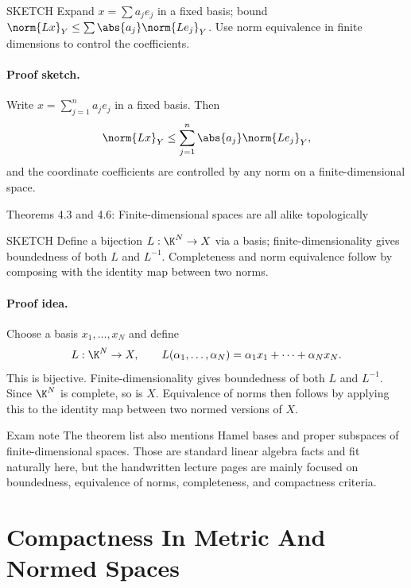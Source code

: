\documentclass[header={Lecture 2 Exam Study Notes}]{study-note}
\begin{document}
\begin{prooflevelbox}{SKETCH}
Expand $x=\sum a_je_j$ in a fixed basis; bound $\norm{Lx}_Y\le\sum\abs{a_j}\norm{Le_j}_Y$. Use norm equivalence in finite dimensions to control the coefficients.
\end{prooflevelbox}

\paragraph{Proof sketch.}
Write $x=\sum_{j=1}^n a_je_j$ in a fixed basis. Then
\[
\norm{Lx}_Y\le \sum_{j=1}^n \abs{a_j}\norm{Le_j}_Y,
\]
and the coordinate coefficients are controlled by any norm on a finite-dimensional space.

\begin{thmbox}{Theorems 4.3 and 4.6: Finite-dimensional spaces are all alike topologically}
\thmFiniteDimProperties
\end{thmbox}

\begin{prooflevelbox}{SKETCH}
Define a bijection $L:\K^N\to X$ via a basis; finite-dimensionality gives boundedness of both $L$ and $L^{-1}$. Completeness and norm equivalence follow by composing with the identity map between two norms.
\end{prooflevelbox}

\paragraph{Proof idea.}
Choose a basis $x_1,\dots,x_N$ and define
\[
L:\K^N\to X,
\qquad
L(\alpha_1,\dots,\alpha_N)=\alpha_1x_1+\cdots+\alpha_Nx_N.
\]
This is bijective. Finite-dimensionality gives boundedness of both $L$ and $L^{-1}$. Since $\K^N$ is complete, so is $X$. Equivalence of norms then follows by applying this to the identity map between two normed versions of $X$.

\begin{warningbox}{Exam note}
The theorem list also mentions Hamel bases and proper subspaces of finite-dimensional spaces. Those are standard linear algebra facts and fit naturally here, but the handwritten lecture pages are mainly focused on boundedness, equivalence of norms, completeness, and compactness criteria.
\end{warningbox}

\section{Compactness In Metric And Normed Spaces}
\end{document}
